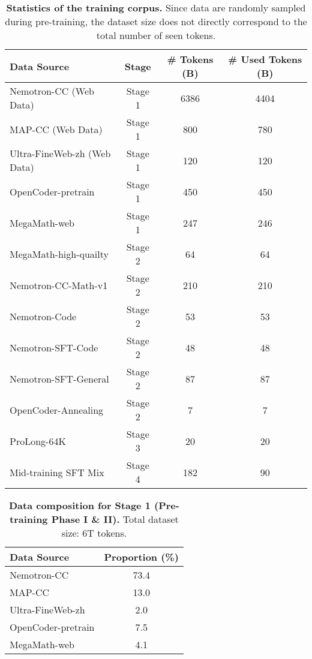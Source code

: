 \documentclass[]{bytedance_seed}
\newcommand{\1}{\mathbf{1}}
\begin{document}
\begin{table}[ht]
\label{tab:data_stat_of_training_corpus}
\small
\centering
\caption{\textbf{Statistics of the training corpus.} Since data are randomly sampled during pre-training, the dataset size does not directly correspond to the total number of seen tokens.}
\label{tab:training_data_details}
\begin{tabular}{l|ccc}
\toprule
\textbf{Data Source} & \textbf{Stage} & \textbf{\# Tokens (B)} & \textbf{\# Used Tokens (B)} \\
\hline
Nemotron-CC (Web Data) & Stage 1 & 6386 & 4404 \\
MAP-CC (Web Data) & Stage 1 & 800 & 780\\
Ultra-FineWeb-zh (Web Data) & Stage 1 & 120 & 120 \\
OpenCoder-pretrain & Stage 1 & 450 & 450 \\
MegaMath-web  & Stage 1 & 247 & 246 \\
MegaMath-high-quailty & Stage 2 & 64 & 64\\
Nemotron-CC-Math-v1 & Stage 2 & 210 & 210 \\
Nemotron-Code & Stage 2 & 53 & 53 \\
Nemotron-SFT-Code & Stage 2 & 48 & 48 \\
Nemotron-SFT-General & Stage 2 & 87 & 87 \\
OpenCoder-Annealing & Stage 2 & 7 & 7  \\
ProLong-64K & Stage 3 & 20 & 20 \\
Mid-training SFT Mix & Stage 4 & 182 & 90 \\
\bottomrule
\end{tabular}
\end{table}

\begin{table}[ht]
\small
\centering
\caption{\textbf{Data composition for Stage 1 (Pre-training Phase I \& II).} Total dataset size: 6T tokens.}
\label{tab:stage1_composition}
\begin{tabular}{l|c}
\toprule
\textbf{Data Source} & \textbf{Proportion (\%)} \\
\hline
Nemotron-CC & 73.4 \\
MAP-CC & 13.0 \\
Ultra-FineWeb-zh & 2.0 \\
OpenCoder-pretrain & 7.5 \\
MegaMath-web & 4.1 \\
\bottomrule
\end{tabular}
\end{table}
\end{document}
